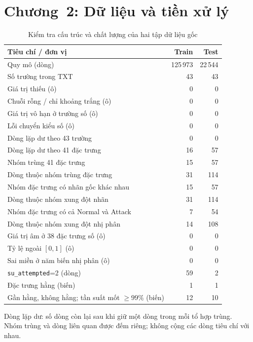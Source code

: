 \documentclass[../main.tex]{subfiles}
\begin{document}
\section{Chương~2: Dữ liệu và tiền xử lý}

\begin{table}[H]
\centering
\caption{Kiểm tra cấu trúc và chất lượng của hai tập dữ liệu gốc}
\label{tab:t2:quality}
\small
\setlength{\tabcolsep}{3pt}
\begin{tabular}{p{10.1cm}rr}
\toprule
Tiêu chí / đơn vị & Train & Test \\
\midrule
Quy mô (dòng) & 125\,973 & 22\,544 \\
Số trường trong TXT & 43 & 43 \\
Giá trị thiếu (ô) & 0 & 0 \\
Chuỗi rỗng / chỉ khoảng trắng (ô) & 0 & 0 \\
Giá trị vô hạn ở trường số (ô) & 0 & 0 \\
Lỗi chuyển kiểu số (ô) & 0 & 0 \\
Dòng lặp dư theo 43 trường & 0 & 0 \\
Dòng lặp dư theo 41 đặc trưng & 16 & 57 \\
Nhóm trùng 41 đặc trưng & 15 & 57 \\
Dòng thuộc nhóm trùng đặc trưng & 31 & 114 \\
Nhóm đặc trưng có nhãn gốc khác nhau & 15 & 57 \\
Dòng thuộc nhóm xung đột nhãn & 31 & 114 \\
Nhóm đặc trưng có cả Normal và Attack & 7 & 54 \\
Dòng thuộc nhóm xung đột nhị phân & 14 & 108 \\
Giá trị âm ở 38 đặc trưng số (ô) & 0 & 0 \\
Tỷ lệ ngoài $[0,1]$ (ô) & 0 & 0 \\
Sai miền ở năm biến nhị phân (ô) & 0 & 0 \\
\texttt{su\_attempted}=2 (dòng) & 59 & 2 \\
Đặc trưng hằng (biến) & 1 & 1 \\
Gần hằng, không hằng; tần suất mốt $\geq99\%$ (biến) & 12 & 10 \\
\bottomrule
\end{tabular}
\par\smallskip\footnotesize Dòng lặp dư: số dòng còn lại sau khi giữ một dòng trong mỗi tổ hợp trùng. Nhóm trùng và dòng liên quan được đếm riêng; không cộng các dòng tiêu chí với nhau.
\end{table}
\end{document}
